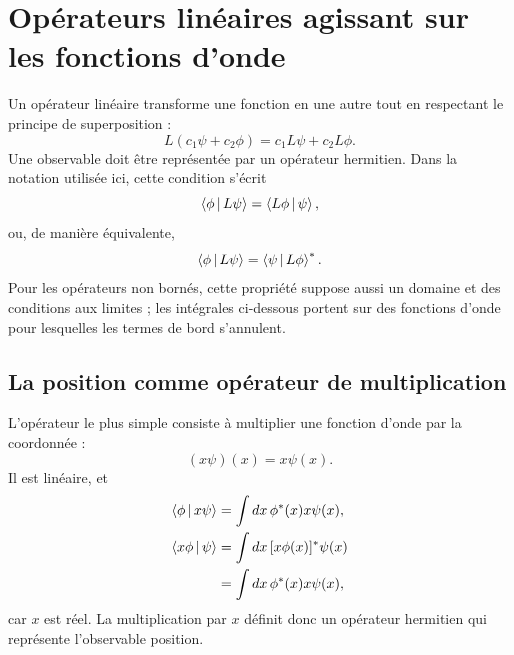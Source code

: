 \begin{classroomqa}
\end{classroomqa}

\section{Opérateurs linéaires agissant sur les fonctions d’onde}

Un opérateur linéaire transforme une fonction en une autre tout en respectant le principe de superposition :
\begin{equation}
L(c_1\psi+c_2\phi)
=
c_1L\psi+c_2L\phi.
\end{equation}
Une observable doit être représentée par un opérateur hermitien. Dans la notation utilisée ici, cette condition s’écrit
\begin{equation}
\left\langle\phi\,\middle|\,L\psi\right\rangle
=
\left\langle L\phi\,\middle|\,\psi\right\rangle,
\label{eq:l8-hermitian-condition}
\end{equation}
ou, de manière équivalente,
\begin{equation}
\left\langle\phi\,\middle|\,L\psi\right\rangle
=
\left\langle\psi\,\middle|\,L\phi\right\rangle^*.
\end{equation}
Pour les opérateurs non bornés, cette propriété suppose aussi un domaine et des conditions aux limites ; les intégrales ci-dessous portent sur des fonctions d’onde pour lesquelles les termes de bord s’annulent.

\subsection{La position comme opérateur de multiplication}

L’opérateur le plus simple consiste à multiplier une fonction d’onde par la coordonnée :
\begin{equation}
(x\psi)(x)=x\psi(x).
\label{eq:l8-position-operator}
\end{equation}
Il est linéaire, et
\begin{align}
\left\langle\phi\,\middle|\,x\psi\right\rangle
&=
\int dx\,\phi^*(x)x\psi(x), \notag\\
\left\langle x\phi\,\middle|\,\psi\right\rangle
&=
\int dx\,[x\phi(x)]^*\psi(x) \notag\\
&=
\int dx\,\phi^*(x)x\psi(x),
\end{align}
car \(x\) est réel. La multiplication par \(x\) définit donc un opérateur hermitien qui représente l’observable position.

